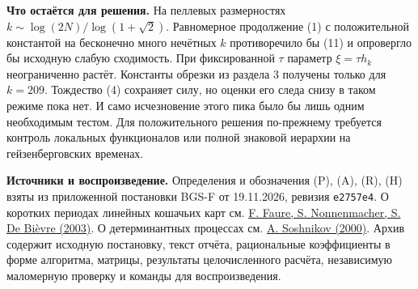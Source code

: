 \documentclass[11pt,a4paper]{article}
\newcommand{\subt}[1]{\par\medskip\noindent\textbf{#1.}\quad}
\begin{document}
\subt{Что остаётся для решения} На пеллевых размерностях $k\sim\log(2N)/\log(1+\sqrt2)$. Равномерное продолжение (1) с положительной константой на бесконечно много нечётных $k$ противоречило бы (11) и опровергло бы исходную слабую сходимость. При фиксированной $\tau$ параметр $\xi=\tau h_k$ неограниченно растёт. Константы обрезки из раздела 3 получены только для $k=209$. Тождество (4) сохраняет силу, но оценки его следа снизу в таком режиме пока нет. И само исчезновение этого пика было бы лишь одним необходимым тестом. Для положительного решения по-прежнему требуется контроль локальных функционалов или полной знаковой иерархии на гейзенберговских временах.

\subt{Источники и воспроизведение} Определения и обозначения (P), (A), (R), (H) взяты из приложенной постановки BGS-F от 19.11.2026, ревизия \texttt{e2757e4}. О коротких периодах линейных кошачьих карт см. \href{https://doi.org/10.1007/s00220-003-0888-3}{F. Faure, S. Nonnenmacher, S. De Bièvre (2003)}. О детерминантных процессах см. \href{https://arxiv.org/abs/math/0002099}{A. Soshnikov (2000)}. Архив содержит исходную постановку, текст отчёта, рациональные коэффициенты в форме алгоритма, матрицы, результаты целочисленного расчёта, независимую маломерную проверку и команды для воспроизведения.
\end{document}
